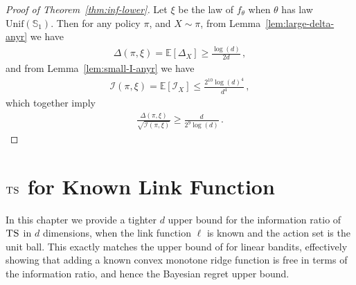\documentclass[letter, 12pt]{report}
\newcommand{\sphere}{\mathbb{S}}
\newcommand{\brak}[1]{\left[ #1 \right]}
\newcommand{\E}{\mathbb E}
\newcommand{\I}{\mathcal{I}}
\newcommand{\1}{\mathbf{1}}
\newcommand{\ts}{\textsc{TS}\xspace}
\theoremstyle{plain}
\theoremstyle{definition}
\theoremstyle{remark}
\begin{document}
\begin{proof}[Proof of Theorem~\ref{thm:inf-lower}]
    Let $\xi$ be the law of $f_\theta$ when $\theta$ has law $\text{Unif}(\sphere_1)$.
    Then for any policy $\pi$, and $X \sim \pi$,
    from Lemma~\ref{lem:large-delta-anyr} we have
    \begin{align*}
        \Delta(\pi, \xi)
        =
        \E\brak{\Delta_X}
        \geq    \frac{\log(d)}{2d}\,,
    \end{align*}
    and from Lemma~\ref{lem:small-I-anyr} we have
    \begin{align*}
        \I(\pi, \xi) = \E[\I_X] \leq \frac{2^{10}\log(d)^4}{d^4} \,,
    \end{align*}
    which together imply
    \begin{align*}
        \frac{\Delta(\pi, \xi)}{\sqrt{\I(\pi, \xi)}}
        \geq \frac{d}{2^{9}\log(d)}\,.
    \end{align*}
\end{proof}

\chapter{$\ts$ for Known Link Function}
In this chapter we provide a tighter $d$ upper bound for the
information ratio of $\ts$ in $d$ dimensions, when the link function
$\ell$ is known and the action set is the unit ball.
This exactly matches the upper bound of \cite{RV16} for linear bandits,
effectively showing that adding a known convex monotone ridge function is free in terms of the information ratio, and hence the Bayesian regret upper bound.
\end{document}
